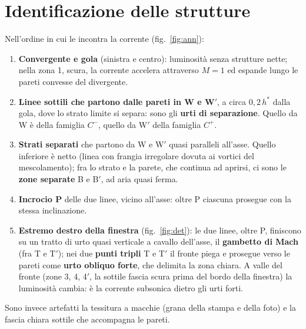 \documentclass[11pt,a4paper]{article}
\newcommand{\Cp}{C^{+}}
\newcommand{\Cm}{C^{-}}
\begin{document}
\section{Identificazione delle strutture}
Nell'ordine in cui le incontra la corrente (fig.~\ref{fig:ann}):
\begin{enumerate}
\item \textbf{Convergente e gola} (sinistra e centro): luminosità senza strutture nette; nella zona 1, scura, la
  corrente accelera attraverso $M=1$ ed espande lungo le pareti convesse del divergente.
\item \textbf{Linee sottili che partono dalle pareti in W e W$'$}, a circa $0{,}2\,h^*$ dalla gola, dove lo strato
  limite si separa: sono gli \textbf{urti di separazione}. Quello da W è della famiglia $\Cm$, quello da W$'$ della
  famiglia $\Cp$.
\item \textbf{Strati separati} che partono da W e W$'$ quasi paralleli all'asse. Quello inferiore è netto (linea con
  frangia irregolare dovuta ai vortici del mescolamento); fra lo strato e la parete, che continua ad aprirsi, ci sono
  le \textbf{zone separate} B e B$'$, ad aria quasi ferma.
\item \textbf{Incrocio P} delle due linee, vicino all'asse: oltre P ciascuna prosegue con la stessa inclinazione.
\item \textbf{Estremo destro della finestra} (fig.~\ref{fig:det}): le due linee, oltre P, finiscono su un tratto di urto quasi verticale a
  cavallo dell'asse, il \textbf{gambetto di Mach} (fra T e T$'$); nei due \textbf{punti tripli} T e T$'$ il fronte
  piega e prosegue verso le pareti come \textbf{urto obliquo forte}, che delimita la zona chiara. A valle del fronte
  (zone 3, 4, 4$'$, la sottile fascia scura prima del bordo della finestra) la luminosità cambia: è la corrente
  subsonica dietro gli urti forti.
\end{enumerate}
Sono invece artefatti la tessitura a macchie (grana della stampa e della foto) e la fascia chiara sottile che
accompagna le pareti.

\end{document}
